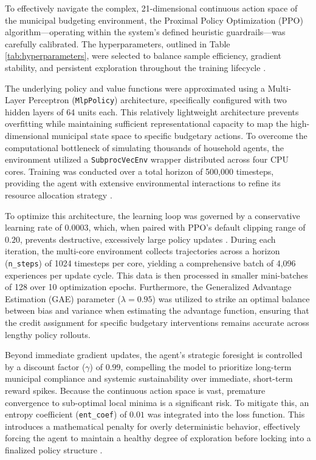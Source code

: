 To effectively navigate the complex, 21-dimensional continuous action space of the municipal budgeting environment, the Proximal Policy Optimization (PPO) algorithm—operating within the system's defined heuristic guardrails—was carefully calibrated. The hyperparameters, outlined in Table \ref{tab:hyperparameters}, were selected to balance sample efficiency, gradient stability, and persistent exploration throughout the training lifecycle \citep{Raffin2021}.

The underlying policy and value functions were approximated using a Multi-Layer Perceptron (\texttt{MlpPolicy}) architecture, specifically configured with two hidden layers of 64 units each. This relatively lightweight architecture prevents overfitting while maintaining sufficient representational capacity to map the high-dimensional municipal state space to specific budgetary actions. To overcome the computational bottleneck of simulating thousands of household agents, the environment utilized a \texttt{SubprocVecEnv} wrapper distributed across four CPU cores. Training was conducted over a total horizon of 500,000 timesteps, providing the agent with extensive environmental interactions to refine its resource allocation strategy \citep{Mousavi2021}.

To optimize this architecture, the learning loop was governed by a conservative learning rate of $0.0003$, which, when paired with PPO's default clipping range of $0.20$, prevents destructive, excessively large policy updates \citep{Raffin2021}. During each iteration, the multi-core environment collects trajectories across a horizon (\texttt{n\_steps}) of 1024 timesteps per core, yielding a comprehensive batch of 4,096 experiences per update cycle. This data is then processed in smaller mini-batches of 128 over 10 optimization epochs. Furthermore, the Generalized Advantage Estimation (GAE) parameter ($\lambda = 0.95$) was utilized to strike an optimal balance between bias and variance when estimating the advantage function, ensuring that the credit assignment for specific budgetary interventions remains accurate across lengthy policy rollouts.

Beyond immediate gradient updates, the agent's strategic foresight is controlled by a discount factor ($\gamma$) of $0.99$, compelling the model to prioritize long-term municipal compliance and systemic sustainability over immediate, short-term reward spikes. Because the continuous action space is vast, premature convergence to sub-optimal local minima is a significant risk. To mitigate this, an entropy coefficient (\texttt{ent\_coef}) of $0.01$ was integrated into the loss function. This introduces a mathematical penalty for overly deterministic behavior, effectively forcing the agent to maintain a healthy degree of exploration before locking into a finalized policy structure \citep{Abdallah2021, Raffin2021}.

